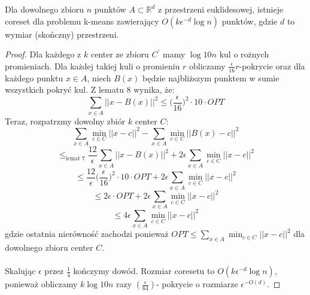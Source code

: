 \begin{thm}
    Dla dowolnego zbioru $n$ punktów $A \subset \mathbb{R}^d$ z przestrzeni euklidesowej, istnieje coreset dla problemu k-means zawierający $O(k\epsilon^{-d} \log n)$ punktów, gdzie $d$ to wymiar (skończny) przestrzeni.
\end{thm}
\begin{proof}
    Dla każdego z $k$ center ze zbioru $C^{'}$ mamy $\log 10n$ kul o rożnych promieniach.
    Dla każdej takiej kuli o promieniu $r$ obliczamy $\frac{\epsilon}{16}r$-pokrycie oraz dla każdego punktu $x \in A$, niech $B(x)$ będzie najbliższym punktem w sumie wszystkich pokryć kul.
    Z lematu 8 wynika, że:
    \begin{equation}
        \sum_{x\in A} ||x - B(x)||^{2} \leq \Big( \frac{\epsilon}{16} \Big)^{2} \cdot 10 \cdot OPT
    \end{equation}
    Teraz, rozpatrzmy dowolny zbiór $k$ center $C$:
    \begin{equation}
        \sum_{x\in A} \min_{c \in C} ||x - c||^{2} - \sum_{x\in A} \min_{c \in C} ||B(x) - c||^{2}
    \end{equation}
    \begin{equation}
        \leq_{\text{lemat 7}} \frac{12}{\epsilon} \sum_{x\in A} ||x - B(x)||^{2} + 2\epsilon \sum_{x\in A} \min_{c \in C} ||x - c||^{2}
    \end{equation}
    \begin{equation}
        \leq \frac{12}{\epsilon} \Big( \frac{\epsilon}{16} \Big)^{2} \cdot 10 \cdot OPT + 2\epsilon \sum_{x\in A} \min_{c \in C} ||x - c||^{2}
    \end{equation}
    \begin{equation}
        \leq 2\epsilon \cdot OPT + 2\epsilon \sum_{x\in A} \min_{c \in C} ||x - c||^{2}
    \end{equation}
    \begin{equation}
        \leq 4\epsilon \sum_{x\in A} \min_{c \in C} ||x - c||^{2}
    \end{equation}
    gdzie ostatnia nierówność zachodzi ponieważ $OPT \leq \sum_{x\in A} \min_{c \in C} ||x - c||^{2}$ dla dowolnego zbioru center $C$.
    \\~\\
    Skalując $\epsilon$ przez $\frac{1}{4}$ kończymy dowód.
    Rozmiar coresetu to $O(k\epsilon^{-d} \log n)$, ponieważ obliczamy $k \log 10n$ razy $(\frac{\epsilon}{64})$- pokrycie o rozmiarze $\epsilon^{-O(d)}$.
\end{proof}
